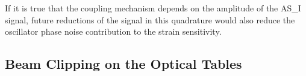 If it is true that the coupling mechanism depends on the amplitude of the
AS\_I signal, future reductions of the signal in this quadrature would also 
reduce the oscillator phase noise contribution to the strain sensitivity.



%
%
%
%
%
%
%


\subsection{Beam Clipping on the Optical Tables}


